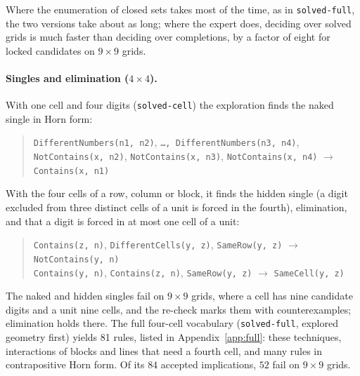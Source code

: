 \documentclass[11pt,a4paper]{article}
\theoremstyle{definition}
\theoremstyle{remark}
\newcommand{\code}[1]{\texttt{#1}}
\begin{document}
Where the enumeration of closed sets takes most of the time, as in \code{solved-full}, the two versions take about as long; where the expert does, deciding over solved grids is much faster than deciding over completions, by a factor of eight for locked candidates on $9 \times 9$ grids.

\paragraph{Singles and elimination ($4 \times 4$).}
With one cell and four digits (\code{solved-cell}) the exploration finds the naked single in Horn form:
\begin{quote}\small\raggedright
\texttt{DifferentNumbers(n1,~n2)}, \allowbreak \texttt{\ldots,~DifferentNumbers(n3,~n4)}, \allowbreak \texttt{NotContains(x,~n2)}, \allowbreak \texttt{NotContains(x,~n3)}, \allowbreak \texttt{NotContains(x,~n4)} \;$\to$\; \texttt{Contains(x,~n1)}
\end{quote}
With the four cells of a row, column or block, it finds the hidden single (a digit excluded from three distinct cells of a unit is forced in the fourth), elimination, and that a digit is forced in at most one cell of a unit:
\begin{quote}\small\raggedright
\texttt{Contains(z,~n)}, \allowbreak \texttt{DifferentCells(y,~z)}, \allowbreak \texttt{SameRow(y,~z)} \;$\to$\; \texttt{NotContains(y,~n)}\\
\texttt{Contains(y,~n)}, \allowbreak \texttt{Contains(z,~n)}, \allowbreak \texttt{SameRow(y,~z)} \;$\to$\; \texttt{SameCell(y,~z)}
\end{quote}
The naked and hidden singles fail on $9 \times 9$ grids, where a cell has nine candidate digits and a unit nine cells, and the re-check marks them with counterexamples; elimination holds there. The full four-cell vocabulary (\code{solved-full}, explored geometry first) yields 81 rules, listed in Appendix~\ref{app:full}: these techniques, interactions of blocks and lines that need a fourth cell, and many rules in contrapositive Horn form. Of its $84$ accepted implications, $52$ fail on $9 \times 9$ grids.
\end{document}
